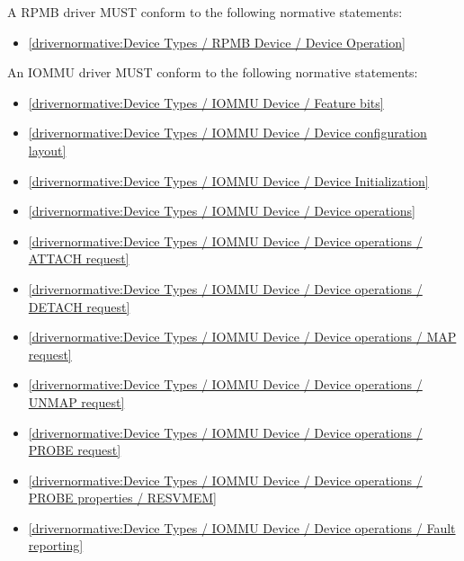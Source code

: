 A RPMB driver MUST conform to the following normative statements:

\begin{itemize}
\item \ref{drivernormative:Device Types / RPMB Device / Device Operation}
\end{itemize}
\label{sec:Conformance / Driver Conformance / IOMMU Driver Conformance}

An IOMMU driver MUST conform to the following normative statements:

\begin{itemize}
\item \ref{drivernormative:Device Types / IOMMU Device / Feature bits}
\item \ref{drivernormative:Device Types / IOMMU Device / Device configuration layout}
\item \ref{drivernormative:Device Types / IOMMU Device / Device Initialization}
\item \ref{drivernormative:Device Types / IOMMU Device / Device operations}
\item \ref{drivernormative:Device Types / IOMMU Device / Device operations / ATTACH request}
\item \ref{drivernormative:Device Types / IOMMU Device / Device operations / DETACH request}
\item \ref{drivernormative:Device Types / IOMMU Device / Device operations / MAP request}
\item \ref{drivernormative:Device Types / IOMMU Device / Device operations / UNMAP request}
\item \ref{drivernormative:Device Types / IOMMU Device / Device operations / PROBE request}
\item \ref{drivernormative:Device Types / IOMMU Device / Device operations / PROBE properties / RESVMEM}
\item \ref{drivernormative:Device Types / IOMMU Device / Device operations / Fault reporting}
\end{itemize}

\label{sec:Conformance / Driver Conformance / Sound Driver Conformance}

